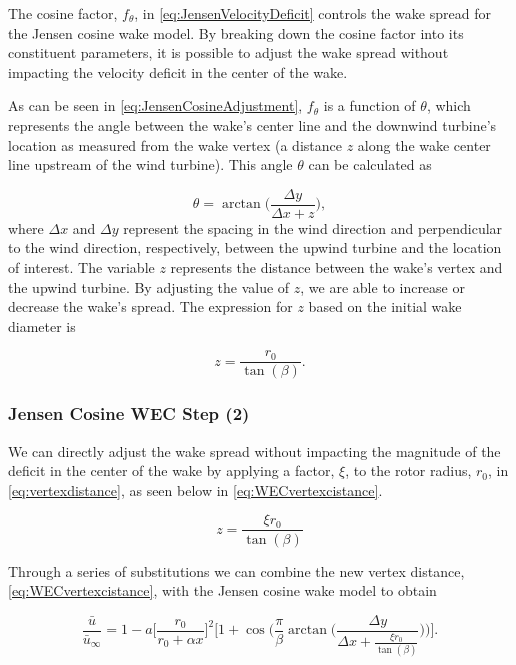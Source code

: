 \documentclass[journal abbreviation, manuscript]{copernicus}
\begin{document}
	The cosine factor, $f_\theta$, in \ref{eq:JensenVelocityDeficit} controls the wake spread for the Jensen cosine wake model. By breaking down the cosine factor into its constituent parameters, it is possible to adjust the wake spread without impacting the velocity deficit in the center of the wake.
	
	As can be seen in \ref{eq:JensenCosineAdjustment}, $f_\theta$ is a function of $\theta$, which represents the angle between the wake's center line and the downwind turbine's location as measured from the wake vertex (a distance $z$ along the wake center line upstream of the wind turbine). This angle $\theta$ can be calculated as
	
	\begin{equation}
		\theta = \arctan\Big( \frac{\Delta y}{\Delta x + z} \Big),
		\label{eq:Theta}
	\end{equation}
	where $\Delta x$ and $\Delta y$ represent the spacing in the wind direction and perpendicular to the wind direction, respectively, between the upwind turbine and the location of interest. The variable $z$ represents the distance between the wake's vertex and the upwind turbine. By adjusting the value of $z$, we are able to increase or decrease the wake's spread. The expression for $z$ based on the initial wake diameter is
	
	\begin{equation}
		z = \frac{r_0}{\tan(\beta)}.
		\label{eq:vertexdistance}
	\end{equation} 
	
	
	\subsubsection{Jensen Cosine WEC Step (2)}
	We can directly adjust the wake spread without impacting the magnitude of the deficit in the center of the wake by applying a factor, $\xi$, to the rotor radius, $r_0$, in \ref{eq:vertexdistance}, as seen below in \ref{eq:WECvertexcistance}.
	
	\begin{equation}
		z = \frac{\xi r_0}{\tan(\beta)}
		\label{eq:WECvertexcistance}
	\end{equation}
	
	Through a series of substitutions we can combine the new vertex distance, \ref{eq:WECvertexcistance}, with the Jensen cosine wake model to obtain
	
	\begin{equation}
		\frac{\bar{u}}{\bar{u}_\infty} = 1 - a \bigg[\frac{r_0}{r_0 + \alpha x} \bigg]^2 \Bigg[1 + \cos{\Bigg(\frac{\pi}{\beta} \arctan{\Bigg(\frac{\Delta y}{\Delta x + \frac{\xi r_0}{\tan(\beta)}}} \Bigg) \Bigg)} \Bigg].
		\label{eq:JensenVelocityDeficitCombined}
	\end{equation}
	
\end{document}
